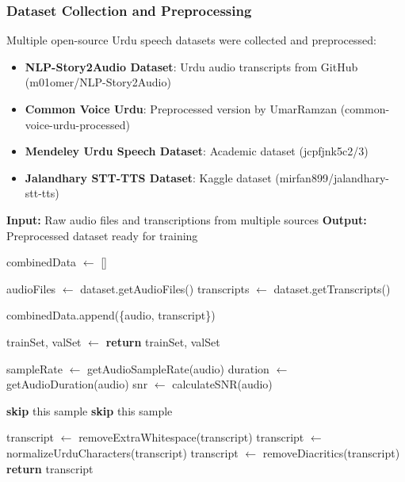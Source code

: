 \subsubsection{Dataset Collection and Preprocessing}

Multiple open-source Urdu speech datasets were collected and preprocessed:

\begin{itemize}
    \item \textbf{NLP-Story2Audio Dataset}: Urdu audio transcripts from GitHub (m01omer/NLP-Story2Audio)
    \item \textbf{Common Voice Urdu}: Preprocessed version by UmarRamzan (common-voice-urdu-processed)
    \item \textbf{Mendeley Urdu Speech Dataset}: Academic dataset (jcpfjnk5c2/3)
    \item \textbf{Jalandhary STT-TTS Dataset}: Kaggle dataset (mirfan899/jalandhary-stt-tts)
\end{itemize}

\begin{algorithm}[H]
\caption{Urdu Dataset Preprocessing Pipeline}
\begin{algorithmic}[1]
\State \textbf{Input:} Raw audio files and transcriptions from multiple sources
\State \textbf{Output:} Preprocessed dataset ready for training

    \State combinedData $\gets$ []
    
        \State audioFiles $\gets$ dataset.getAudioFiles()
        \State transcripts $\gets$ dataset.getTranscripts()
        
            \State {}
            \State {}
            \State {}
            \State {}
            \State combinedData.append(\{audio, transcript\})
        \EndFor
    \EndFor
    
    \State trainSet, valSet $\gets$ 
    \State \textbf{return} trainSet, valSet
\EndProcedure

    \State sampleRate $\gets$ getAudioSampleRate(audio)
    \State duration $\gets$ getAudioDuration(audio)
    \State snr $\gets$ calculateSNR(audio)
    
        \State \textbf{skip} this sample
    \EndIf
        \State \textbf{skip} this sample
    \EndIf
\EndProcedure

    \State transcript $\gets$ removeExtraWhitespace(transcript)
    \State transcript $\gets$ normalizeUrduCharacters(transcript)
    \State transcript $\gets$ removeDiacritics(transcript)
    \State \textbf{return} transcript
\EndProcedure
\end{algorithmic}
\end{algorithm}

